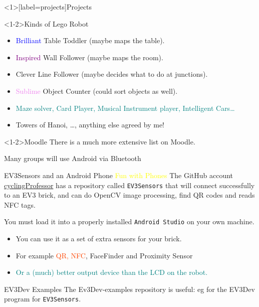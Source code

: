 \documentclass[color=pdftex,usenames,dvipsnames, aspectratio=169]{beamer}
\begin{document}
\begin{frame}<1>[label=projects]{Projects}
\begin{block}<1-2>{Kinds of Lego Robot}
\begin{itemize}
\item \textcolor{Blue}{Brilliant} Table Toddler (maybe maps the table).
\item \textcolor{purple}{Inspired} Wall Follower (maybe maps the room).
\item \textcolor{OliveGreen}{Clever} Line Follower (maybe decides what to do at junctions).
\item \textcolor{violet}{Sublime} Object Counter (could sort objects as well).
\item \textcolor{teal}{Maze solver, Card Player, Musical Instrument player, Intelligent Cars\dots}
\item \textcolor{RedOrange}{Towers of Hanoi}, \dots, \alert{anything else agreed by me!}
\end{itemize}
\end{block}
\begin{alertblock}<1-2>{Moodle}
There is a much more extensive list on Moodle.
\end{alertblock}
\end{frame}

\begin{frame}{Many groups will use Android via Bluetooth}
\begin{block}{EV3Sensors and an Android Phone \textcolor{yellow}{Fun with Phones}}
The GitHub  account \href{https://github.com/cyclingProfessor}{cyclingProfessor} has a repository called \texttt{EV3Sensors} that will connect successfully to an EV3 brick, and can do \alert{OpenCV image processing}, \alert{find QR codes} and \alert{reads NFC tags}.

You must load it into a properly installed \texttt{Android Studio} on your own machine.
\begin{itemize}
  \item \textcolor{OliveGreen}{You can use it as a set of extra sensors for your brick.}
  \item For example \textcolor{OrangeRed}{QR, NFC}, FaceFinder and Proximity Sensor
  \item \textcolor{teal}{Or a (much) better output device than the LCD on the robot.}
\end{itemize}
\end{block}
\begin{block}{EV3Dev Examples}
\alert{The Ev3Dev-examples repository is useful: eg for the EV3Dev program for \texttt{EV3Sensors}. }
\end{block}
\end{frame}
\end{document}
